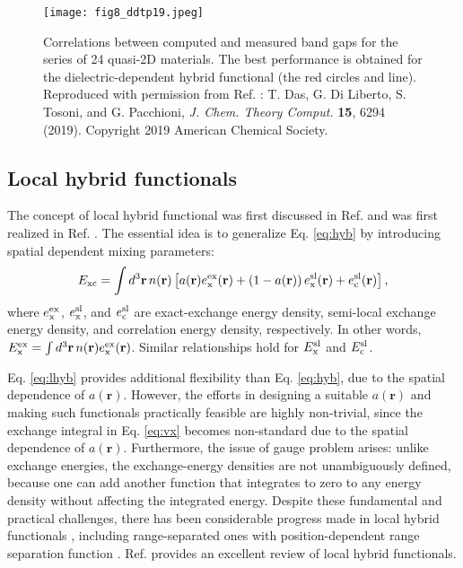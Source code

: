 \documentclass[aip, amsmath, amssymb, reprint, longbibliography]{revtex4-2}
\def\mr{\mathbf{r}}
\begin{document}
\begin{figure}[htp]
\centering
\texttt{[image: fig8\_ddtp19.jpeg]}
\caption{Correlations between computed and measured band gaps for the series of 24 quasi-2D materials. The best performance is obtained for the dielectric-dependent hybrid functional (the red circles and line). Reproduced with
permission from Ref. : T. Das, G. Di Liberto, S. Tosoni, and G. Pacchioni, \emph{J. Chem. Theory Comput.} \textbf{15}, 6294 (2019). Copyright 2019 American Chemical Society.}
\label{fig:ddtp19}
\end{figure}

\subsection{Local hybrid functionals}
\label{sec:lhybrid}

The concept of local hybrid functional was first discussed in Ref.  and was first realized in Ref. . The essential idea is to generalize Eq. \eqref{eq:hyb} by introducing spatial dependent mixing parameters:
\begin{equation}
E_{\rm xc}=\int d^3\mr \, n(\mr)\left[a(\mr)e_{\rm x}^{\rm ex}(\mr)+\left(1-a(\mr)\right)e_{\rm x}^{\rm sl}(\mr)+e_{\rm c}^{\rm sl}(\mr)\right],
\label{eq:lhyb}
\end{equation}
where $e_{\rm x}^{\rm ex}$, $e_{\rm x}^{\rm sl}$, and $e_{\rm c}^{\rm sl}$ are exact-exchange energy density, semi-local exchange energy density, and correlation energy density, respectively. In other words, $E_{\rm x}^{\rm ex}=\int d^3\mr \, n(\mr)e_{\rm x}^{\rm ex}(\mr)$. Similar relationships hold for $E_{\rm x}^{\rm sl}$ and $E_{\rm c}^{\rm sl}$.

Eq. \eqref{eq:lhyb} provides additional flexibility than Eq. \eqref{eq:hyb}, due to the spatial dependence of $a(\mr)$. However, the efforts in designing a suitable $a(\mr)$ and making such functionals practically feasible are highly non-trivial, since the exchange integral in Eq. \eqref{eq:vx} becomes non-standard due to the spatial dependence of $a(\mr)$. Furthermore, the issue of gauge problem \cite{BCL98} arises: unlike exchange energies, the exchange-energy densities are not unambiguously defined, because one can add another function that integrates to zero to any energy density without affecting the integrated energy. Despite these fundamental and practical challenges, there has been considerable progress made in local hybrid functionals \cite{BRAK07,PSTS08,SKMK14,J14,HF22}, including range-separated ones \cite{JKS08,HS10} with position-dependent range separation function \cite{KSPS08,KB20}. Ref.  provides an excellent review of local hybrid functionals.
\end{document}
